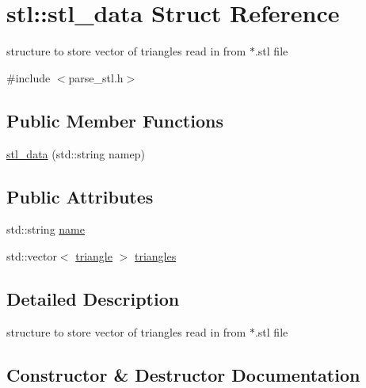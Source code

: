 \hypertarget{structstl_1_1stl__data}{}\section{stl\+:\+:stl\+\_\+data Struct Reference}
\label{structstl_1_1stl__data}


structure to store vector of triangles read in from $\ast$.stl file  




{\ttfamily \#include $<$parse\+\_\+stl.\+h$>$}

\subsection*{Public Member Functions}
\begin{DoxyCompactItemize}
\item 
\mbox{\hyperlink{structstl_1_1stl__data_a06898d3f2eb37dca887363dca067b89b}{stl\+\_\+data}} (std\+::string namep)
\end{DoxyCompactItemize}
\subsection*{Public Attributes}
\begin{DoxyCompactItemize}
\item 
std\+::string \mbox{\hyperlink{structstl_1_1stl__data_a567a8c7ba6526f8c70b52ef97e965cc4}{name}}
\item 
std\+::vector$<$ \mbox{\hyperlink{structstl_1_1triangle}{triangle}} $>$ \mbox{\hyperlink{structstl_1_1stl__data_a901ead3f2f8f2f3563a2e4bee87b825e}{triangles}}
\end{DoxyCompactItemize}


\subsection{Detailed Description}
structure to store vector of triangles read in from $\ast$.stl file 

\subsection{Constructor \& Destructor Documentation}
\mbox{\label{structstl_1_1stl__data_a06898d3f2eb37dca887363dca067b89b}} 
